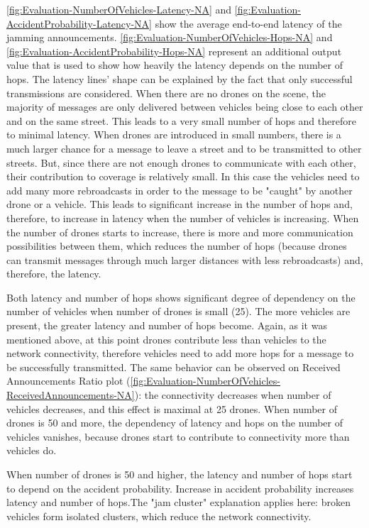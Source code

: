 \documentclass[]{nsm-thesis}
\begin{document}
\cref{fig:Evaluation-NumberOfVehicles-Latency-NA} and \cref{fig:Evaluation-AccidentProbability-Latency-NA} show the average end-to-end latency of the jamming announcements. \cref{fig:Evaluation-NumberOfVehicles-Hops-NA} and \cref{fig:Evaluation-AccidentProbability-Hops-NA} represent an additional output value that is used to show how heavily the latency depends on the number of hops. The latency lines' shape can be explained by the fact that only successful transmissions are considered. When there are no drones on the scene, the majority of messages are only delivered between vehicles being close to each other and on the same street. This leads to a very small number of hops and therefore to minimal latency. When drones are introduced in small numbers, there is a much larger chance for a message to leave a street and to be transmitted to other streets. But, since there are not enough drones to communicate with each other, their contribution to coverage is relatively small. In this case the vehicles need to add many more rebroadcasts in order to the message to be "caught" by another drone or a vehicle. This leads to significant increase in the number of hops and, therefore, to increase in latency when the number of vehicles is increasing. When the number of drones starts to increase, there is more and more communication possibilities between them, which reduces the number of hops (because drones can transmit messages through much larger distances with less rebroadcasts) and, therefore, the latency.

Both latency and number of hops shows significant degree of dependency on the number of vehicles when number of drones is small (25). The more vehicles are present, the greater latency and number of hops become. Again, as it was mentioned above, at this point drones contribute less than vehicles to the network connectivity, therefore vehicles need to add more hops for a message to be successfully transmitted. The same behavior can be observed on Received Announcements Ratio plot (\cref{fig:Evaluation-NumberOfVehicles-ReceivedAnnouncements-NA}): the connectivity decreases when number of vehicles decreases, and this effect is maximal at 25 drones. When number of drones is 50 and more, the dependency of latency and hops on the number of vehicles vanishes, because drones start to contribute to connectivity more than vehicles do. 

When number of drones is 50 and higher, the latency and number of hops start to depend on the accident probability. Increase in accident probability increases latency and number of hops.The "jam cluster" explanation applies here: broken vehicles form isolated clusters, which reduce the network connectivity.
\end{document}
